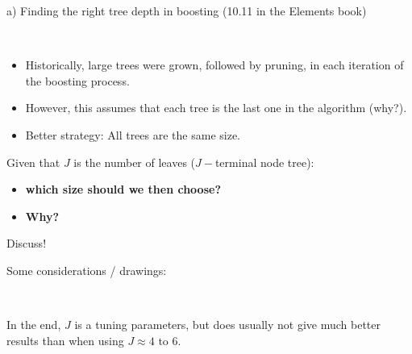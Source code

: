 \documentclass[
  10pt,
  ignorenonframetext,
]{beamer}
\providecommand{\tightlist}{%
  \setlength{\itemsep}{0pt}\setlength{\parskip}{0pt}}
\begin{document}
\begin{frame}
\begin{block}{a) Finding the right tree depth in boosting}
\protect\hypertarget{a-finding-the-right-tree-depth-in-boosting}{}
(10.11 in the Elements book)

\(~\)

\begin{itemize}
\tightlist
\item
  Historically, large trees were grown, followed by pruning, in each
  iteration of the boosting process.
\end{itemize}

\vspace{2mm}

\begin{itemize}
\tightlist
\item
  However, this assumes that each tree is the last one in the algorithm
  (why?).
\end{itemize}

\vspace{2mm}

\begin{itemize}
\tightlist
\item
  Better strategy: All trees are the same size.
\end{itemize}

\pause

\vspace{6mm}

Given that \(J\) is the number of leaves (\(J-\)terminal node tree):

\vspace{2mm}

\begin{itemize}
\tightlist
\item
  \textbf{which size should we then choose?}
\item
  \textbf{Why?}
\end{itemize}

\vspace{2mm}

Discuss!
\end{block}
\end{frame}

\begin{frame}
Some considerations / drawings:

\vspace{60mm}

\(~\)

In the end, \(J\) is a tuning parameters, but does usually not give much
better results than when using \(J\approx 4 \text{ to } 6\).

\vspace{50mm}
\end{frame}
\end{document}
